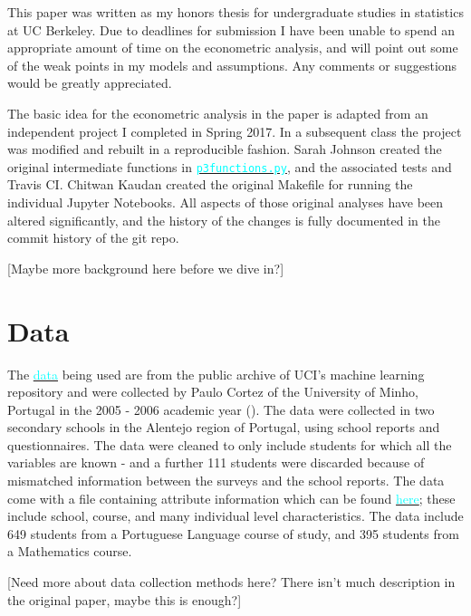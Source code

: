 \documentclass[12pt]{article}
\newcommand{\inlinecode}{\texttt}
\begin{document}
This paper was written as my honors thesis for undergraduate studies in statistics at UC Berkeley. Due to deadlines for submission I have been unable to spend an appropriate amount of time on the econometric analysis, and will point out some of the weak points in my models and assumptions. Any comments or suggestions would be greatly appreciated. 

The basic idea for the econometric analysis in the paper is adapted from an independent project I completed in Spring 2017. In a subsequent class the project was modified and rebuilt in a reproducible fashion. Sarah Johnson created the original intermediate functions in \href{https://github.com/nadavtadelis/Reproducible_Metrics/blob/master/p3functions.py}{\textcolor{cyan}{\inlinecode{p3functions.py}}}, and the associated tests and Travis CI. Chitwan Kaudan created the original Makefile for running the individual Jupyter Notebooks. All aspects of those original analyses have been altered significantly, and the history of the changes is fully documented in the commit history of the git repo.

\textcolor{BrickRed}{[Maybe more background here before we dive in?]}


\newpage
\section{Data}
The \href{https://archive.ics.uci.edu/ml/datasets/Student+Performance#}{\textcolor{cyan}{data}} being used are from the public archive of UCI's machine learning repository and were collected by Paulo Cortez of the University of Minho, Portugal in the 2005 - 2006 academic year (\cite{data_paper}). The data were collected in two secondary schools in the Alentejo region of Portugal, using school reports and questionnaires. The data were cleaned to only include students for which all the variables are known - and a further 111 students were discarded because of mismatched information between the surveys and the school reports. The data come with a file containing attribute information which can be found \href{https://archive.ics.uci.edu/ml/datasets/Student+Performance#}{\textcolor{cyan}{here}}; these include school, course, and many individual level characteristics. The data include 649 students from a Portuguese Language course of study, and 395 students from a Mathematics course. 

\textcolor{BrickRed}{[Need more about data collection methods here? There isn't much description in the original paper, maybe this is enough?]}
\end{document}
